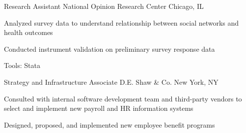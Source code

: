   {Research Assistant}
  {National Opinion Research Center}
  {Chicago, IL}
  {
    \item Analyzed survey data to understand relationship between social networks and health outcomes
    \item Conducted instrument validation on preliminary survey response data
    \item Tools: Stata
  }

  {Strategy and Infrastructure Associate}
  {D.E. Shaw \& Co.}
  {New York, NY}
  {
    \item Consulted with internal software development team and third-party vendors to select and implement new payroll and HR information systems
    \item Designed, proposed, and implemented new employee benefit programs
  }
